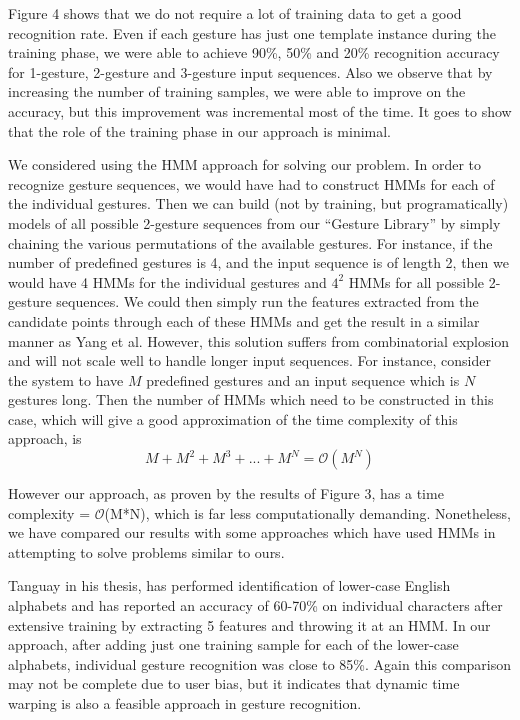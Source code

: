 \documentclass[twoside]{article}
\newcommand{\bigO}{\ensuremath{\mathcal{O}}}
\begin{document}
\begin{multicols}{2}
Figure 4 shows that we do not require a lot of training data to get a good recognition rate. Even if each gesture has just one template instance during the training phase, we were able to achieve 90\%, 50\% and 20\% recognition accuracy for 1-gesture, 2-gesture and 3-gesture input sequences. Also we observe that by increasing the number of training samples, we were able to improve on the accuracy, but this improvement was incremental most of the time. It goes to show that the role of the training phase in our approach is minimal.

We considered using the HMM approach for solving our problem. In order to recognize gesture sequences, we would have had to construct HMMs for each of the individual gestures. Then we can build (not by training, but programatically) models of all possible 2-gesture sequences from our ``Gesture Library'' by simply chaining the various permutations of the available gestures. %
For instance, if the number of predefined gestures is 4, and the input sequence is of length 2, then we would have 4 HMMs for the individual gestures and $4^2$ HMMs for all possible 2-gesture sequences. We could then simply run the features extracted from the candidate points through each of these HMMs and get the result in a similar manner as Yang et al. However, this solution suffers from combinatorial explosion and will not scale well to handle longer input sequences. For instance, consider the system to have $M$ predefined gestures and an input sequence which is $N$ gestures long. Then the number of HMMs which need to be constructed in this case, which will give a good approximation of the time complexity of this approach, is
\[
	M + M^2 + M^3 + ... + M^N = \bigO{(M^N)}
\]

However our approach, as proven by the results of Figure 3, has a time complexity = \bigO{(M*N)}, which is far less computationally demanding. Nonetheless, we have compared our results with some approaches which have used HMMs in attempting to solve problems similar to ours.


Tanguay \cite{tanguay_jr_hidden_1995} in his thesis, has performed identification of lower-case English alphabets and has reported an accuracy of 60-70\% on individual characters after extensive training by extracting 5 features and throwing it at an HMM. In our approach, after adding just one training sample for each of the lower-case alphabets, individual gesture recognition was close to 85\%. Again this comparison may not be complete due to user bias, but it indicates that dynamic time warping is also a feasible approach in gesture recognition.


\end{multicols}
\end{document}
